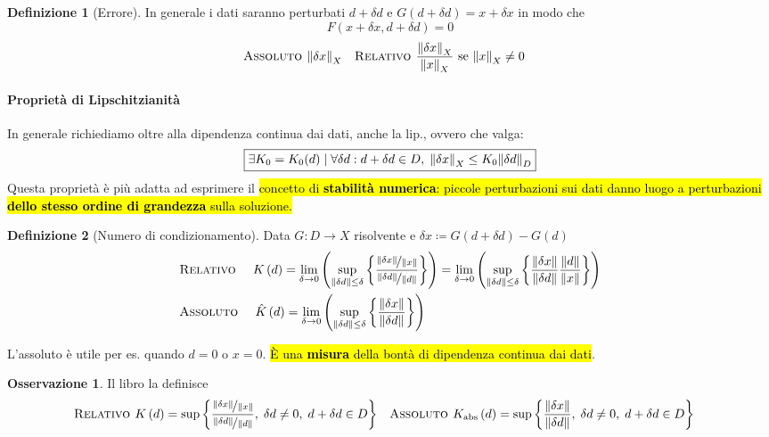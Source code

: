 \documentclass[a4paper,10pt]{article}
\theoremstyle{definition}
\theoremstyle{indentdefinition}
\newtheorem{defn}{Definizione}[section]
\theoremstyle{indenttheorem}
\theoremstyle{myremark}
\newtheorem*{rem*}{Osservazione}
\theoremstyle{indentgeneral}
\theoremstyle{plain}
\theoremstyle{plain}
\begin{document}
\begin{defn}[Errore] In generale i dati saranno perturbati $d+\delta d$ e  $G(d+\delta d)=x+\delta x$ in modo che 
$$F(x+\delta x, d+\delta d)=0$$
    \begin{align*}
\textsc{Assoluto } & \norm{\delta x}_X & \textsc{Relativo } &  \frac{\norm{\delta x}_X}{\norm{x}_X} \text{ se } \norm{x}_X \ne0
\end{align*}
\end{defn}

\paragraph{Proprietà di Lipschitzianità} In generale richiediamo oltre alla dipendenza continua dai dati, anche la lip., ovvero che valga:
$$\boxed{\exists K_0=K_0(d)\mid \forall\delta d:d+\delta d\in D,\;\norm{\delta x}_X\le K_0\norm{\delta d}_D}$$
Questa proprietà è più adatta ad esprimere il \hl{concetto di \textbf{stabilità numerica}: piccole perturbazioni sui dati danno luogo a perturbazioni \textbf{dello stesso ordine di grandezza} sulla soluzione.}

\begin{defn}[Numero di condizionamento]
Data $G\colon D\rightarrow X$ risolvente e $\delta x\coloneqq G\left(d+\delta d\right)-G\left(d\right)$
\begin{align*}
&\textsc{Relativo } \quad K\left(d\right)=\lim_{\delta\rightarrow0}\left(\sup_{\left\Vert \delta d\right\Vert \leq\delta}\left\{ \frac{\nicefrac{\left\Vert \delta x\right\Vert }{\left\Vert x\right\Vert }}{\nicefrac{\left\Vert \delta d\right\Vert }{\left\Vert d\right\Vert }}\right\} \right) =\lim_{\delta\rightarrow0}\left(\sup_{\left\Vert \delta d\right\Vert \leq\delta}\left\{ \frac{\norm{\delta x}}{\norm{\delta d}}\frac{\norm{d}}{\norm{x}}\right\} \right)\\
&\textsc{Assoluto } \quad \hat{K}\left(d\right)=\lim_{\delta\rightarrow0}\left(\sup_{\left\Vert \delta d\right\Vert \leq\delta}\left\{ \frac{\left\Vert \delta x\right\Vert }{\left\Vert \delta d\right\Vert }\right\} \right)
\end{align*}

L'assoluto è utile per es. quando $d=0$ o $x=0$. \hl{È una \textbf{misura} della bontà di dipendenza continua dai dati}.
\end{defn}

\begin{rem*}
    Il libro la definisce
    \begin{align*}
\textsc{Relativo } & K\left(d\right)=\sup\left\{ \frac{\nicefrac{\left\Vert \delta x\right\Vert }{\left\Vert x\right\Vert }}{\nicefrac{\left\Vert \delta d\right\Vert }{\left\Vert d\right\Vert }},\; \delta d\ne 0,\;d+\delta d\in D\right\} & \textsc{Assoluto } & {K}_{\text{abs}}\left(d\right)=\sup\left\{ \frac{\left\Vert \delta x\right\Vert }{\left\Vert \delta d\right\Vert },\; \delta d\ne 0,\;d+\delta d\in D\right\}
\end{align*}
\end{rem*}
\end{document}
